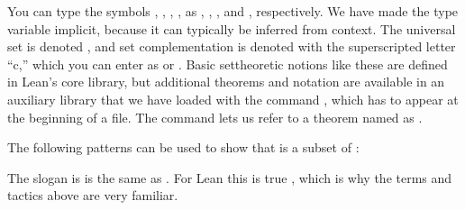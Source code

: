\documentclass[letterpaper,10pt,english]{sphinxmanual}
\begin{document}
\sphinxAtStartPar
You can type the symbols , , , , \sphinxcode{\sphinxupquote{\textbackslash{}}} as 
, , , and \sphinxcode{\sphinxupquote{\textbackslash{}\textbackslash{}}}, respectively.
We have made the type variable  implicit,
because it can typically be inferred from context.
The universal set is denoted ,
and set complementation is denoted with the superscripted letter “c,”
which you can enter as  or .
Basic set\sphinxhyphen{}theoretic notions like these are defined in Lean’s core library,
but additional theorems and notation are available in an auxiliary library that
we have loaded with the command ,
which has to appear at the beginning of a file.
The command  lets us refer to a theorem named
 as .

\sphinxAtStartPar
The following patterns can be used to show that  is a subset of :

\begin{sphinxVerbatim}[commandchars=\\\{\}]
     
  
      
     

      
 
     
   
\end{sphinxVerbatim}

\sphinxAtStartPar
The slogan is  is the same as .
For Lean this is true ,
which is why the terms and tactics above are very familiar.
\end{document}
